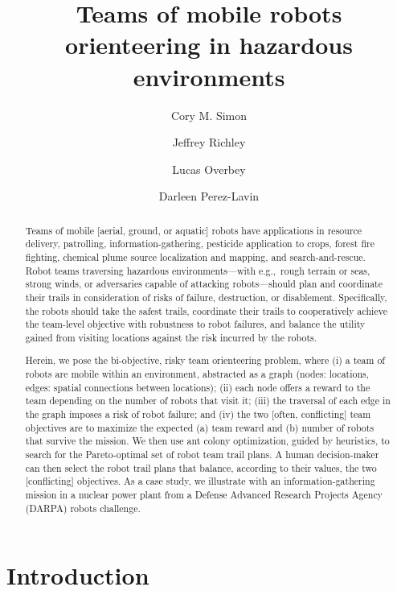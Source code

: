 \documentclass[11pt, oneside]{article}
\title{Teams of mobile robots orienteering in hazardous environments}
\author[1]{Cory M. Simon}
\author[2]{Jeffrey Richley}
\author[2]{Lucas Overbey}
\author[2]{Darleen Perez-Lavin}
\affil[1]{School of Chemical, Biological, and Environmental Engineering. Oregon State University. Corvallis, OR. USA.}
\affil[2]{Naval Information Warfare Center Atlantic. Charleston, SC. USA.}
\begin{document}
\maketitle

\begin{abstract}
Teams of mobile [aerial, ground, or aquatic] robots have applications in resource delivery, patrolling, information-gathering, pesticide application to crops, forest fire fighting, chemical plume source localization and mapping, and search-and-rescue.
Robot teams traversing hazardous environments---with e.g.,\ rough terrain or seas, strong winds, or adversaries capable of attacking robots---should plan and coordinate their trails in consideration of risks of failure, destruction, or disablement.
Specifically, the robots should take the safest trails, coordinate their trails to cooperatively achieve the team-level objective with robustness to robot failures, and balance the utility gained from visiting locations against the risk incurred by the robots.

Herein, we pose the bi-objective, risky team orienteering problem, where (i) a team of robots are mobile within an environment, abstracted as a graph (nodes: locations, edges: spatial connections between locations); (ii) each node offers a reward to the team depending on the number of robots that visit it; (iii) the traversal of each edge in the graph imposes a risk of robot failure; and (iv) the two [often, conflicting] team objectives are to maximize the expected (a) team reward and (b) number of robots that survive the mission. 
We then use ant colony optimization, guided by heuristics, to search for the Pareto-optimal set of robot team trail plans. 
A human decision-maker can then select the robot trail plans that balance, according to their values, the two [conflicting] objectives. As a case study, we illustrate with an information-gathering mission in a nuclear power plant from a Defense Advanced Research Projects Agency (DARPA) robots challenge.
\end{abstract}

\clearpage


\section{Introduction}
\end{document}

